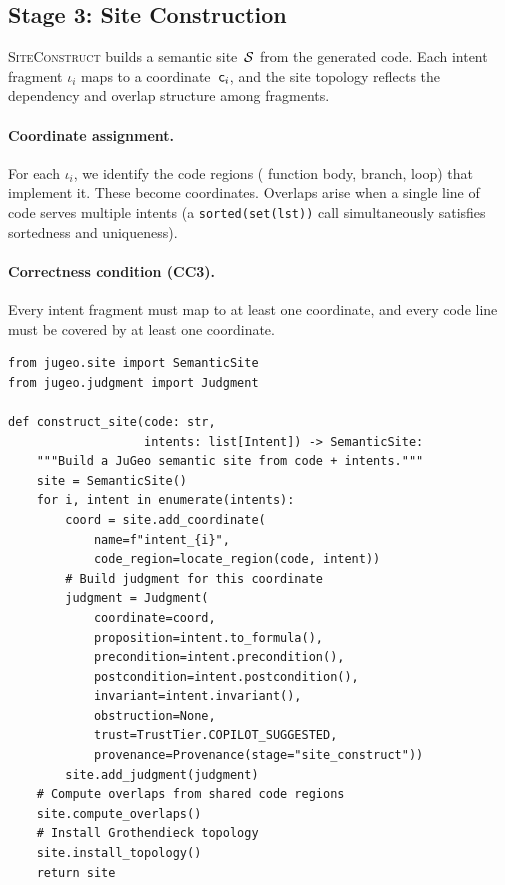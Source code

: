 \documentclass[11pt]{article}
\newcommand{\IntentFrag}{\iota}
\newcommand{\SiteConstruct}{\textsc{SiteConstruct}}
\begin{document}
\subsection{Stage 3: Site Construction}\label{sec:stage3}

\SiteConstruct{} builds a \JuGeo{} semantic site~$\mathcal{S}$ from the
generated code.  Each intent fragment $\IntentFrag_i$ maps to a
coordinate~$\mathsf{c}_i$, and the site topology reflects the dependency
and overlap structure among fragments.

\paragraph{Coordinate assignment.}
For each $\IntentFrag_i$, we identify the code regions (\eg
function body, branch, loop) that implement it.  These become
coordinates.  Overlaps arise when a single line of code serves
multiple intents (\eg a \texttt{sorted(set(lst))} call simultaneously
satisfies sortedness and uniqueness).

\paragraph{Correctness condition (CC3).}
Every intent fragment must map to at least one coordinate, and every
code line must be covered by at least one coordinate.

\begin{lstlisting}[caption={Site construction from generated code.},label={lst:site-construct}]
from jugeo.site import SemanticSite
from jugeo.judgment import Judgment

def construct_site(code: str,
                   intents: list[Intent]) -> SemanticSite:
    """Build a JuGeo semantic site from code + intents."""
    site = SemanticSite()
    for i, intent in enumerate(intents):
        coord = site.add_coordinate(
            name=f"intent_{i}",
            code_region=locate_region(code, intent))
        # Build judgment for this coordinate
        judgment = Judgment(
            coordinate=coord,
            proposition=intent.to_formula(),
            precondition=intent.precondition(),
            postcondition=intent.postcondition(),
            invariant=intent.invariant(),
            obstruction=None,
            trust=TrustTier.COPILOT_SUGGESTED,
            provenance=Provenance(stage="site_construct"))
        site.add_judgment(judgment)
    # Compute overlaps from shared code regions
    site.compute_overlaps()
    # Install Grothendieck topology
    site.install_topology()
    return site
\end{lstlisting}
\end{document}
